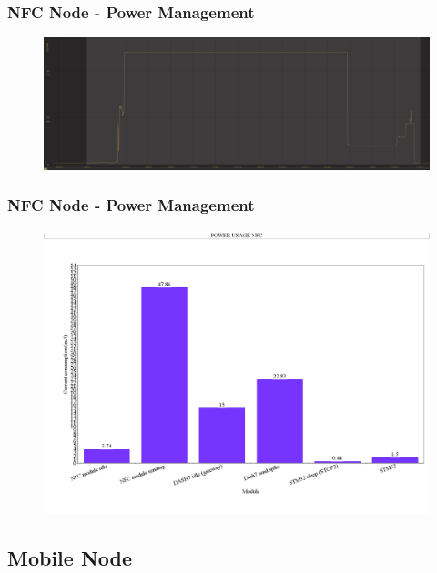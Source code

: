\begin{frame}[fragile]
\frametitle{NFC Node - Power Management} 
\begin{figure}
  \centering
	\includegraphics[width=\textwidth]{images/NFC14.png}
\end{figure}
\end{frame}

\begin{frame}[fragile]
\frametitle{NFC Node - Power Management} 
\begin{figure}
  \centering
	\includegraphics[width=\textwidth]{images/NFC15.png}
\end{figure}
\end{frame}


\subsection{Mobile Node}


